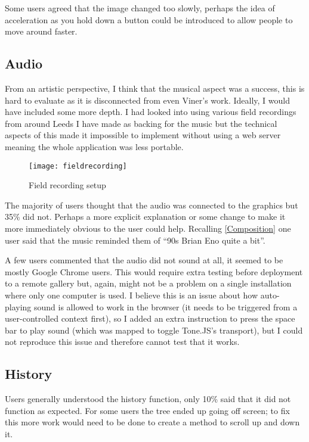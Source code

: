 Some users agreed that the image changed too slowly, perhaps the idea of
acceleration as you hold down a button could be introduced to allow people to
move around faster.

\subsection{Audio}
From an artistic perspective, I think that the musical aspect was a success, this
is hard to evaluate as it is disconnected from even Viner's work. Ideally, I
would have included some more depth. I had looked into using various field
recordings from around Leeds I have made as backing for the music but the
technical aspects of this made it impossible to implement without using a web
server meaning the whole application was less portable.

\begin{figure}[H]
    \centering
    \texttt{[image: fieldrecording]}
    \caption{Field recording setup}
\end{figure}

The majority of users thought that the audio was connected to the graphics but
35\% did not. Perhaps a more explicit explanation or some change to make it more
immediately obvious to the user could help. Recalling \autoref{Composition} one
user said that the music reminded them of ``90s Brian Eno quite a bit''.

A few users commented that the audio did not sound at all, it seemed to be
mostly Google Chrome users. This would require extra testing before deployment
to a remote gallery but, again, might not be a problem on a single installation
where only one computer is used. I believe this is an issue about how
auto-playing sound is allowed to work in the browser (it needs to be triggered
from a user-controlled context first), so I added an extra instruction to press
the space bar to play sound (which was mapped to toggle Tone.JS's transport),
but I could not reproduce this issue and therefore cannot test that it works.

\subsection{History}
Users generally understood the history function, only 10\% said that it did not
function as expected. For some users the tree ended up going off screen; to fix
this more work would need to be done to create a method to scroll up and down
it.

